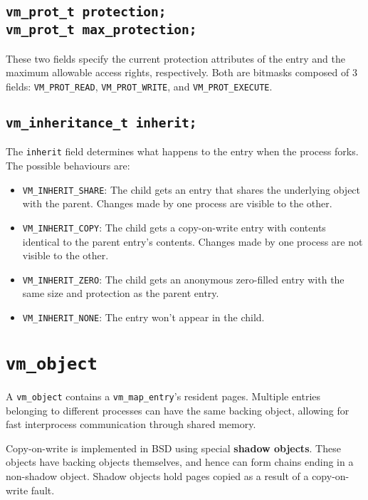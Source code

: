 \documentclass[shortabstract, english]{iithesis}
\begin{document}
\subsection*{\texttt{vm_prot_t protection;} \\
  \texttt{vm_prot_t max_protection;}}
These two fields specify the current protection attributes of the entry and the
maximum allowable access rights, respectively. Both are bitmasks composed of 3
fields: \texttt{VM_PROT_READ}, \texttt{VM_PROT_WRITE}, and
\texttt{VM_PROT_EXECUTE}.

\subsection*{\texttt{vm_inheritance_t inherit;}}
The \texttt{inherit} field determines what happens to the entry when the
process forks. The possible behaviours are:
\begin{itemize}
\item \texttt{VM_INHERIT_SHARE}: The child gets an entry that shares the
  underlying object with the parent. Changes made by one process are visible to
  the other.
\item \texttt{VM_INHERIT_COPY}: The child gets a copy-on-write entry with
  contents identical to the parent entry's contents. Changes made by one process
  are not visible to the other.
\item \texttt{VM_INHERIT_ZERO}: The child gets an anonymous zero-filled
  entry with the same size and protection as the parent entry.
\item \texttt{VM_INHERIT_NONE}: The entry won't appear in the child.
\end{itemize}

\section{\texttt{vm_object}}

A \texttt{vm_object} contains a \texttt{vm_map_entry}'s resident
pages. Multiple entries belonging to different processes can have the same
backing object, allowing for fast interprocess communication through shared memory.

Copy-on-write is implemented in BSD using special \textbf{shadow objects}. These
objects have backing objects themselves, and hence can form chains ending in a
non-shadow object. Shadow objects hold pages copied as a result of a
copy-on-write fault.
\end{document}
